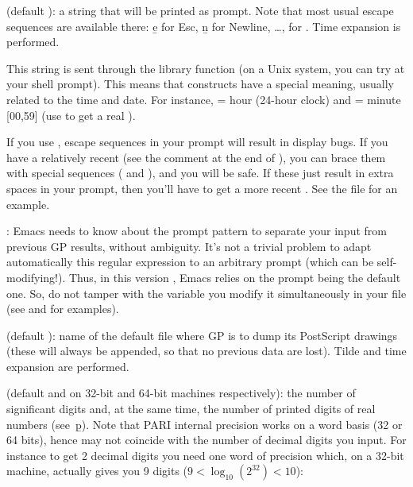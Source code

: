  (default ): a string that will be printed as
prompt. Note that most usual escape sequences are available there: \b{e} for
Esc, \b{n} for Newline, \dots, \kbd{\bs\bs} for \kbd{\bs}. Time expansion is
performed.

This string is sent through the library function  (on a
Unix system, you can try  at your shell prompt). This means
that \kbd{\%} constructs have a special meaning, usually related to the time
and date. For instance,  = hour (24-hour clock) and  =
minute [00,59] (use \kbd{\%\%} to get a real \kbd{\%}).

If you use , escape sequences in your prompt will result in
display bugs. If you have a relatively recent  (see the comment
at the end of ), you can brace them with special sequences
(\kbd{\bs[} and \kbd{\bs]}), and you will be safe. If these just result in
extra spaces in your prompt, then you'll have to get a more recent
. See the file  for an example.

: Emacs needs to know about the prompt pattern to
separate your input from previous GP results, without ambiguity. It's not a
trivial problem to adapt automatically this regular expression to an
arbitrary prompt (which can be self-modifying!). Thus, in this version \vers,
Emacs relies on the prompt being the default one. So, do not tamper with the
 variable  you modify it simultaneously in your
 file (see  and  for
examples).

 (default ): name of the default file where
GP is to dump its PostScript drawings (these will always be appended, so that
no previous data are lost). Tilde and time expansion are performed.

 (default  and  on 32-bit and 64-bit machines respectively): the number of significant digits and, at the same
time, the number of printed digits of real numbers (see~\b{p}). Note that
PARI internal precision works on a word basis (32 or 64 bits), hence may not
coincide with the number of decimal digits you input. For instance to get 2
decimal digits you need one word of precision which, on a 32-bit machine,
actually gives you 9 digits ($9 < \log_{10}(2^{32}) < 10$):

